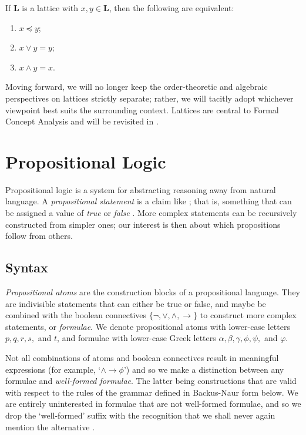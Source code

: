 \begin{lemma}
  \label{lemma:the-connecting-lemma}
  If $\mathbf{L}$ is a lattice with $x, y \in \mathbf{L}$, then the following are equivalent:
  \begin{enumerate}
      \setlength\itemsep{0pt}
      \setlength\parsep{0pt}
    \item $x \preceq y$;
    \item $x \vee y = y$;
    \item $x \wedge y = x$.
  \end{enumerate}
\end{lemma}

Moving forward, we will no longer keep the order‑theoretic and algebraic perspectives on lattices strictly separate; rather, we will tacitly adopt whichever viewpoint best suits the surrounding context. Lattices are central to Formal Concept Analysis and will be revisited in .

\section{Propositional Logic}
\label{section:propositional-logic}

Propositional logic is a system for abstracting reasoning away from natural language. A \textit{propositional statement} is a claim like ; that is, something that can be assigned a value of \textit{true} or \textit{false} \cite[p. 7]{Ben1993Mathematical}. More complex statements can be recursively constructed from simpler ones; our interest is then about which propositions follow from others. 

\subsection{Syntax}
\label{subsection:syntax}
\textit{Propositional atoms} are the construction blocks of a propositional language. They are indivisible statements that can either be true or false, and maybe be combined with the boolean connectives $\{\neg, \lor, \land, \rightarrow\}$ to construct more complex statements, or \textit{formulae}. We denote propositional atoms with lower-case letters $p,q,r,s,$ and $t$, and formulae with lower-case Greek letters $\alpha, \beta, \gamma, \phi, \psi,$ and $\varphi$. 

Not all combinations of atoms and boolean connectives result in meaningful expressions (for example, `$\land \rightarrow \phi$') and so we make a distinction between any formulae and \textit{well-formed formulae}. The latter being constructions that are valid with respect to the rules of the grammar defined in Backus-Naur form below. We are entirely uninterested in formulae that are not well-formed formulae, and so we drop the `well-formed' suffix with the recognition that we shall never again mention the alternative \cite[p. 33]{Huth_Ryan_2004}.

